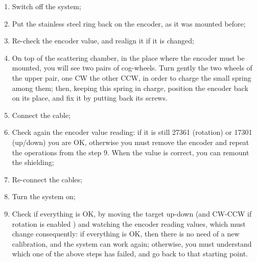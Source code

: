 \begin{enumerate}
	\footnote{One single encoder step error means an offset error  of 
	about 0.04 degrees, or 0.006 mm.}. If values do not match, then turn 
	MANUALLY the encoder axis, until the display value is at the desired 
	one. When done, you can remount the encoder on top of the scattering 
	chamber.
\item Switch off the system;
\item Put the stainless steel ring back on the encoder, as it was mounted 
	before;
\item Re-check the encoder value, and realign it if it is changed; 
\item On top of the scattering chamber, in the place where the encoder must 
	be mounted, you will see two pairs of cog-wheels. Turn gently the two
	wheels of the upper pair, one CW the other CCW, in order to 
	charge the small spring among them; then, keeping this spring in 
	charge, position the encoder back on its place, and fix it by putting 
	back its screws.
\item Connect the cable;
\item Check again the encoder value reading: if it is still 27361 (rotation) or
 	17301 (up/down) you  are OK, otherwise you must remove 
	the encoder and repeat the operations from  the step 9. 
	When the value is correct, you can remount the shielding; 
\item Re-connect the cables;
\item Turn the system on;
\item Check if everything is OK, by moving the target up-down (and CW-CCW if 
	rotation is enabled )
	and watching the encoder reading values, which must change 
	consequently: if everything is OK, then there is no need of a new 
	calibration, and the system can work again;  otherwise, you must 
	understand which one of the above steps has failed, and go back to 
	that starting point. 
\end{enumerate}


